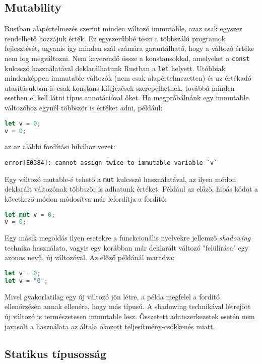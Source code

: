 \subsection{Mutability}
Rustban alapértelmezés szerint minden változó immutable, azaz csak egyszer rendelhető hozzájuk érték. Ez egyszerűbbé teszi a többszálú programok fejlesztését, ugyanis így minden szál számára garantálható, hogy a változó értéke nem fog megváltozni. Nem keverendő össze a konstansokkal, amelyeket a \texttt{const} kulcsszó használatával deklarálhatunk Rustban a \texttt{let} helyett. Utóbbiak mindenképpen immutable változók (nem csak alapértelmezetten) és az értékadó utasításukban is csak konstans kifejezések szerepelhetnek, továbbá minden esetben el kell látni típus annotációval őket.
Ha megpróbálnánk egy immutable változóhoz egynél többször is értéket adni, például:
\begin{lstlisting}[language=Rust, style=boxed]
let v = 0;
v = 0;
\end{lstlisting}
az az alábbi fordítási hibához vezet:
\begin{verbatim}
error[E0384]: cannot assign twice to immutable variable `v`
\end{verbatim}
Egy változó mutable-é tehető a \texttt{mut} kulcsszó használatával, az ilyen módon deklarált változónak többször is adhatunk értéket. Például az előző, hibás kódot a következő módon módosítva már lefordítja a fordító:
\begin{lstlisting}[language=Rust, style=boxed]
let mut v = 0;
v = 0;
\end{lstlisting}
Egy másik megoldás ilyen esetekre a funckcionális nyelvekre %
jellemző \textit{shadowing} technika használata, vagyis egy korábban már deklarált változó "felülírása" egy azonos nevű, új változóval. Az előző példánál maradva:
\begin{lstlisting}[language=Rust, style=boxed]
let v = 0;
let v = "0";
\end{lstlisting}
Mivel gyakorlatilag egy új változó jön létre, a példa megfelel a fordító ellenőrzésén annak ellenére, hogy más típusú. A shadowing technikával létrejött új változó is természetesen immutable lesz. Összetett adatszerkezetek esetén nem javasolt a használata az általa okozott teljesítmény-csökkenés miatt.


\subsection{Statikus típusosság}

